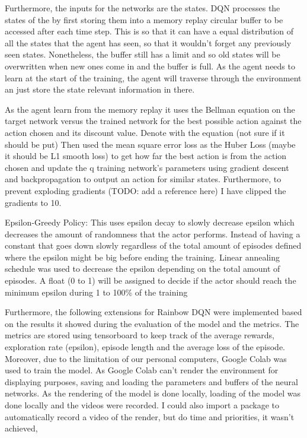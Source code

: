 \documentclass{article}
\begin{document}
Furthermore, the inputs for the networks are the states.
DQN processes the states of the by first storing them into a memory replay circular buffer to be accessed after each time step.
This is so that it can have a equal distribution of all the states that the agent has seen, so that it wouldn't forget any previously seen states.
Nonetheless, the buffer still has a limit and so old states will be overwritten when new ones come in and the buffer is full.
As the agent needs to learn at the start of the training, the agent will traverse through the environment an just store the state relevant information in there.

As the agent learn from the memory replay it uses the Bellman equation on the target network versus the trained network for the best possible action against the action chosen and its discount value.
Denote with the equation (not sure if it should be put)
Then used the mean square error loss as the Huber Loss (maybe it should be L1 smooth loss) to get how far the best action is from the action chosen and update the q training network's parameters using gradient descent and backpropagation to output an action for similar states.
Furthermore, to prevent exploding gradients (TODO: add a reference here) I have clipped the gradients to 10.


Epsilon-Greedy Policy:
This uses epsilon decay to slowly decrease epsilon which decreases the amount of randomness that the actor performs.
Instead of having a constant that goes down slowly regardless of the total amount of episodes defined where the epsilon might be big before ending the training.
Linear annealing schedule was used to decrease the epsilon depending on the total amount of episodes.
A float (0 to 1) will be assigned to decide if the actor should reach the minimum epsilon during 1 to 100\% of the training


Furthermore, the following extensions for Rainbow DQN were implemented based on the results it showed during the evaluation of the model and the metrics.
The metrics are stored using tensorboard to keep track of the average rewards, exploration rate (epsilon), episode length and the average loss of the episode.
Moreover, due to the limitation of our personal computers, Google Colab was used to train the model.
As Google Colab can't render the environment for displaying purposes, saving and loading the parameters and buffers of the neural networks.
As the rendering of the model is done locally, loading of the model was done locally and the videos were recorded.
I could also import a package to automatically record a video of the render, but do time and priorities, it wasn't achieved,
\end{document}
